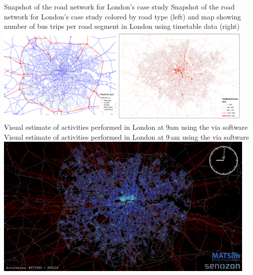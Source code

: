 \createfigure%
{Snapshot of the road network for London's case study}%
{Snapshot of the road network for London's case study colored by road type (left) and map showing number of bus trips per road segment in London using timetable data (right)}%
{\label{fig:london_fig1}}%
{\includegraphics[width=0.95\textwidth, angle=0]{scenarios/figures/london1.png}}%
{}
\createfigure%
{Visual estimate of activities performed in London at 9am using the \gls{via} software}%
{Visual estimate of activities performed in London at 9\,am using the \gls{via} software}%
{\label{fig:london_fig2}}%
{\includegraphics[width=0.95\textwidth, angle=0]{scenarios/figures/london2.png}}%
{}











